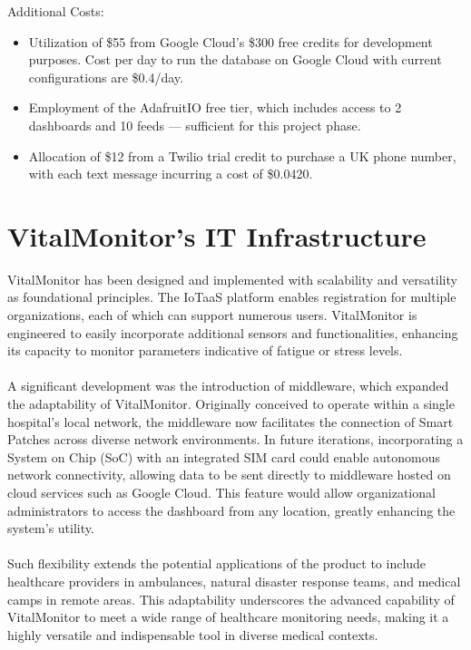 Additional Costs:

\begin{itemize}
    \item Utilization of \$55 from Google Cloud's \$300 free credits for development purposes. Cost per day to run the database on Google Cloud with current configurations are \$0.4/day.
    \item Employment of the AdafruitIO free tier, which includes access to 2 dashboards and 10 feeds — sufficient for this project phase.
    \item Allocation of \$12 from a Twilio trial credit to purchase a UK phone number, with each text message incurring a cost of \$0.0420.
\end{itemize}


\section{VitalMonitor's IT Infrastructure}

VitalMonitor has been designed and implemented with scalability and versatility as foundational principles. The IoTaaS platform enables registration for multiple organizations, each of which can support numerous users. VitalMonitor is engineered to easily incorporate additional sensors and functionalities, enhancing its capacity to monitor parameters indicative of fatigue or stress levels. \\ \\
A significant development was the introduction of middleware, which expanded the adaptability of VitalMonitor. Originally conceived to operate within a single hospital's local network, the middleware now facilitates the connection of Smart Patches across diverse network environments. In future iterations, incorporating a System on Chip (SoC) with an integrated SIM card could enable autonomous network connectivity, allowing data to be sent directly to middleware hosted on cloud services such as Google Cloud. This feature would allow organizational administrators to access the dashboard from any location, greatly enhancing the system's utility. \\ \\
Such flexibility extends the potential applications of the product to include healthcare providers in ambulances, natural disaster response teams, and medical camps in remote areas. This adaptability underscores the advanced capability of VitalMonitor to meet a wide range of healthcare monitoring needs, making it a highly versatile and indispensable tool in diverse medical contexts.

